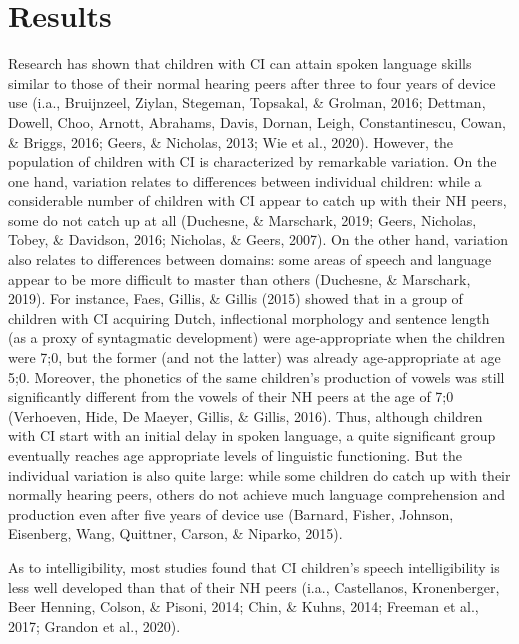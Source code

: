 \section{Results}
%
Research has shown that children with CI can attain spoken language skills similar to
those of their normal hearing peers after three to four years of device use (i.a., Bruijnzeel, Ziylan, Stegeman, Topsakal, \& Grolman, 2016; Dettman, Dowell, Choo, Arnott, Abrahams, Davis, Dornan, Leigh, Constantinescu, Cowan, \& Briggs, 2016; Geers, \& Nicholas,
2013; Wie et al., 2020). However, the population of children with CI is characterized by remarkable variation. On the one hand, variation relates to differences between individual children: while a considerable number of children with CI appear to catch up with their NH peers, some do not catch up at all (Duchesne, \& Marschark, 2019; Geers, Nicholas, Tobey, \& Davidson, 2016; Nicholas, \& Geers, 2007). On the other hand, variation also relates to differences between domains: some areas of speech and language appear to be more difficult to master than others (Duchesne, \& Marschark, 2019). For instance, Faes, Gillis, \& Gillis (2015) showed that in a group of children with CI acquiring Dutch, inflectional morphology and sentence length (as a proxy of syntagmatic development) were age-appropriate when the children were 7;0, but the former (and not the latter) was already age-appropriate at age 5;0. Moreover, the phonetics of the same children’s production of vowels was still significantly different from the vowels of their NH peers
at the age of 7;0 (Verhoeven, Hide, De Maeyer, Gillis, \& Gillis, 2016). Thus, although
children with CI start with an initial delay in spoken language, a quite significant group
eventually reaches age appropriate levels of linguistic functioning. But the individual
variation is also quite large: while some children do catch up with their normally hearing
peers, others do not achieve much language comprehension and production even after five years of device use (Barnard, Fisher, Johnson, Eisenberg, Wang, Quittner, Carson, \&
Niparko, 2015).



As to intelligibility, most studies found that CI children’s speech intelligibility is less
well developed than that of their NH peers (i.a., Castellanos, Kronenberger, Beer Henning, Colson, \& Pisoni, 2014; Chin, \& Kuhns, 2014; Freeman et al., 2017; Grandon et al., 2020). 